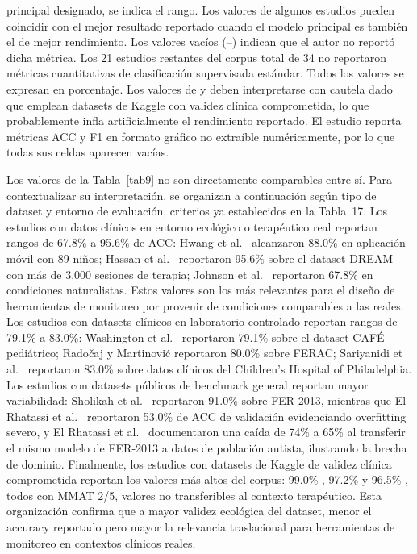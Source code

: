 \documentclass[ASNA,twocolumn]{USG}
\begin{document}
\begin{table}[!t]
\begin{tablenotes}
			principal designado, se indica el rango. Los valores de algunos estudios pueden
			coincidir con el mejor resultado reportado cuando el modelo principal es también el
			de mejor rendimiento. Los valores vacíos (--) indican que el autor no reportó dicha
			métrica. Los 21 estudios restantes del corpus total de 34 no reportaron métricas
			cuantitativas de clasificación supervisada estándar. Todos los valores se expresan
			en porcentaje. Los valores de \cite{Aljbori2025} y \cite{Hosney2024} deben
			interpretarse con cautela dado que emplean datasets de Kaggle con validez clínica
			comprometida, lo que probablemente infla artificialmente el rendimiento reportado.
			El estudio \cite{Rudovic2019} reporta métricas ACC y F1 en formato gráfico no
			extraíble numéricamente, por lo que todas sus celdas aparecen vacías.
		\end{tablenotes}
	\end{table}
	
	Los valores de la Tabla~\ref{tab9} no son directamente comparables entre sí. Para
	contextualizar su interpretación, se organizan a continuación según tipo de dataset
	y entorno de evaluación, criterios ya establecidos en la Tabla~17. Los estudios con
	datos clínicos en entorno ecológico o terapéutico real reportan rangos de 67.8\% a
	95.6\% de ACC: Hwang et al.\ \cite{Hwang2024} alcanzaron 88.0\% en aplicación
	móvil con 89 niños; Hassan et al.\ \cite{Hassan2025} reportaron 95.6\% sobre el
	dataset DREAM con más de 3{,}000 sesiones de terapia; Johnson et al.\
	\cite{Johnson2025} reportaron 67.8\% en condiciones naturalistas. Estos valores son
	los más relevantes para el diseño de herramientas de monitoreo por provenir de
	condiciones comparables a las reales. Los estudios con datasets clínicos en
	laboratorio controlado reportan rangos de 79.1\% a 83.0\%: Washington et al.\
	\cite{Washington2022} reportaron 79.1\% sobre el dataset CAFÉ pediátrico; Radočaj
	y Martinović \cite{Radocaj2025} reportaron 80.0\% sobre FERAC; Sariyanidi et al.\
	\cite{Sariyanidi2025} reportaron 83.0\% sobre datos clínicos del Children's
	Hospital of Philadelphia. Los estudios con datasets públicos de benchmark general
	reportan mayor variabilidad: Sholikah et al.\ \cite{Sholikah2024} reportaron 91.0\%
	sobre FER-2013, mientras que El Rhatassi et al.\ \cite{Rhatassi2025} reportaron
	53.0\% de ACC de validación evidenciando overfitting severo, y El Rhatassi et al.\
	\cite{Rhatassi2024} documentaron una caída de 74\% a 65\% al transferir el mismo
	modelo de FER-2013 a datos de población autista, ilustrando la brecha de dominio.
	Finalmente, los estudios con datasets de Kaggle de validez clínica comprometida
	reportan los valores más altos del corpus: 99.0\% \cite{Aljbori2025}, 97.2\%
	\cite{Hosney2024} y 96.5\% \cite{Ramachandran2025}, todos con MMAT 2/5, valores
	no transferibles al contexto terapéutico. Esta organización confirma que a mayor
	validez ecológica del dataset, menor el accuracy reportado pero mayor la relevancia
	traslacional para herramientas de monitoreo en contextos clínicos reales.
	
\end{document}
